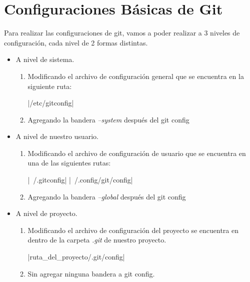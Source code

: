 \section{Configuraciones Básicas de Git}

Para realizar las configuraciones de git, vamos a poder realizar a 3 niveles de configuración, cada nivel de 2 formas distintas.

\begin{itemize}

	\item A nivel de sistema.
	\begin{enumerate}
		\item Modificando el archivo de configuración general que se encuentra en la siguiente ruta:
		\begin{terminal}
			|/etc/gitconfig| 		    
		\end{terminal}
		\item Agregando la bandera \emph{--system} después del git config
	\end{enumerate}
	
	\item A nivel de nuestro usuario.
	\begin{enumerate}
		\item Modificando el archivo de configuración de usuario que se encuentra en una de las siguientes rutas:
		\begin{terminal}
			|~/.gitconfig| 	
			|~/.config/git/config| 		    
		\end{terminal}
		\item Agregando la bandera \emph{--global} después del git config
	\end{enumerate}

	\item A nivel de proyecto.
	\begin{enumerate}
		\item Modificando el archivo de configuración del proyecto se encuentra en dentro de la carpeta \emph{.git} de nuestro proyecto.
	    \begin{terminal}
			|ruta_del_proyecto/.git/config| 		    
		\end{terminal}
		\item Sin agregar ninguna bandera a git config.
	\end{enumerate}	 	
	
\end{itemize}

